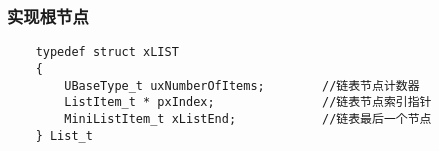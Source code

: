\documentclass[11pt,a4paper]{ctexart}
\begin{document}
\subsubsection{实现根节点}
\begin{lstlisting}
	typedef struct xLIST
	{
		UBaseType_t uxNumberOfItems;        //链表节点计数器
		ListItem_t * pxIndex;               //链表节点索引指针
		MiniListItem_t xListEnd;            //链表最后一个节点
	} List_t
\end{lstlisting}
\end{document}
